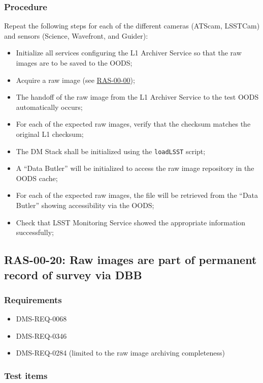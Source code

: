 \documentclass[DM,lsstdraft,STS,toc]{lsstdoc}
\begin{document}
\subsubsection{Procedure}
Repeat the following steps for each of the different cameras (ATScam, LSSTCam) and sensors (Science, Wavefront, and Guider):
\begin{itemize}
\item{Initialize all services configuring the L1 Archiver Service so that the raw images are to be saved to the OODS;}
\item{Acquire a raw image (see \hyperref[ras-00-00]{RAS-00-00});}
\item{The handoff of the raw image from the L1 Archiver Service to the test OODS automatically occurs;}
\item{For each of the expected raw images, verify that the checksum matches the original L1 checksum;}
\item{The DM Stack shall be initialized using the \texttt{loadLSST} script;}
\item{A ``Data Butler'' will be initialized to access the raw image repository in the OODS cache;}
\item{For each of the expected raw images, the file will be retrieved from the ``Data Butler'' showing accessibility via the OODS;}
\item{Check that LSST Monitoring Service showed the appropriate information successfully;}
\end{itemize}




\subsection{RAS-00-20: Raw images are part of permanent record of survey via DBB}
\label{ras-00-20}


\subsubsection{Requirements}


\begin{itemize}
\item{DMS-REQ-0068}
\item{DMS-REQ-0346}
\item{DMS-REQ-0284 (limited to the raw image archiving completeness)}
\end{itemize}


\subsubsection{Test items}
\end{document}
